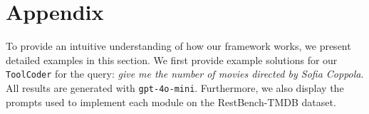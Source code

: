 \section{Appendix}
To provide an intuitive understanding of how our framework works, we present detailed examples in this section. We first provide example solutions for our \texttt{ToolCoder} for the query: \textit{give me the number of movies directed by Sofia Coppola}. All results are generated with \texttt{gpt-4o-mini}. Furthermore, we also display the prompts used to implement each module on the RestBench-TMDB dataset.








